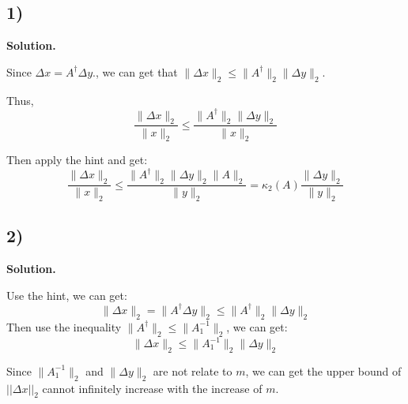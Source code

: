 \documentclass{article}
\newcommand{\0}{{\mathbf{0}}} %
\begin{document}
\subsection*{1)}

\textbf{Solution.}

Since $\Delta x = A^\dagger \Delta y.$, we can get that $\|\Delta x\|_2 \le \|A^\dagger\|_2 \|\Delta y\|_2$.

Thus,
$$
\frac{\|\Delta x\|_2}{\|x\|_2} \le \frac{\|A^\dagger\|_2 \|\Delta y\|_2}{\|x\|_2}
$$

Then apply the hint and get:
$$
\frac{\|\Delta x\|_2}{\|x\|_2} \le \frac{\|A^\dagger\|_2 \|\Delta y\|_2 \|A\|_2}{\|y\|_2} = \kappa_2(A) \frac{\|\Delta y\|_2}{\|y\|_2}
$$

\subsection*{2)}

\textbf{Solution.}

Use the hint, we can get:
$$
\|\Delta x\|_2 = \|A^\dagger \Delta y\|_2 \le \|A^\dagger\|_2 \|\Delta y\|_2
$$
Then use the inequality $\|A^\dagger\|_2\le \|A_1^{-1}\|_2$, we can get:
$$
\|\Delta x\|_2 \le \|A_1^{-1}\|_2 \|\Delta y\|_2
$$

Since $\|A_1^{-1}\|_2$ and $\|\Delta y\|_2$ are not relate to $m$,
we can get the upper bound of $||\Delta x||_2$ cannot infinitely increase with the increase of $m$.
\end{document}
